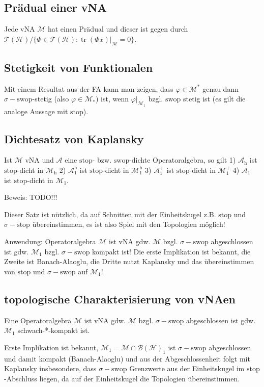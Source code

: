 \documentclass[11pt,a4paper]{scrartcl}
\newcommand{\Hc}{\mathcal{H}}
\newcommand{\A}{\mathcal{A}}
\newcommand{\B}{\mathcal{B}}
\newcommand{\M}{\mathcal{M}}
\newcommand{\T}{\mathcal{T}}
\theoremstyle{plain}
\theoremstyle{definition}
\theoremstyle{remark}
\DeclareMathOperator{\tr}{tr}
\begin{document}
\subsection{Prädual einer vNA}

Jede vNA $\M$ hat einen Prädual und dieser ist gegen durch $\T(\Hc)/\{\Phi\in \T(\Hc): \tr(\Phi x)|_\M = 0 \}$.

\subsection{Stetigkeit von Funktionalen}

Mit einem Resultat aus der FA kann man zeigen, dass $\varphi \in \M^*$ genau dann $\sigma-\mathrm{swop}$-stetig (also $\varphi\in \M_*$) ist, wenn $\varphi|_{\M_1}$ bzgl. $\mathrm{swop}$ stetig ist (es gilt die analoge Aussage mit $\mathrm{stop}$).

\subsection{Dichtesatz von Kaplansky}

Ist $\M$ vNA und $\A$ eine $\mathrm{stop}$- bzw. $\mathrm{swop}$-dichte Operatoralgebra, so gilt 1) $\A_\mathrm{h}$ ist $\mathrm{stop}$-dicht in $\M_\mathrm{h}$ 2) $\A_1^\mathrm{h}$ ist $\mathrm{stop}$-dicht in $\M_1^\mathrm{h}$ 3) $\A_1^+$ ist $\mathrm{stop}$-dicht in $\M_1^+$ 4) $\A_1$ ist $\mathrm{stop}$-dicht in $\M_1$.

Beweis: TODO!!!

Dieser Satz ist nützlich, da auf Schnitten mit der Einheitskugel z.B. $\mathrm{stop}$ und $\sigma-\mathrm{stop}$ übereinstimmen, es ist also Spiel mit den Topologien möglich!

Anwendung: Operatoralgebra $\M$ ist vNA gdw. $\M$ bzgl. $\sigma-\mathrm{swop}$ abgeschlossen ist gdw. $\M_1$ bzgl. $\sigma-\mathrm{swop}$ kompakt ist! Die erste Implikation ist bekannt, die Zweite ist Banach-Alaoglu, die Dritte nutzt Kaplansky und das übereinstimmen von $\mathrm{stop}$ und $\sigma-\mathrm{swop}$ auf $\M_1$!

\subsection{topologische Charakterisierung von vNAen}

Eine Operatoralgebra $\M$ ist vNA gdw. $\M$ bzgl. $\sigma-\mathrm{swop}$ abgeschlossen ist gdw. $\M_1$ schwach-*-kompakt ist.

Erste Implikation ist bekannt, $\M_1=\M\cap \B(\Hc)_1$ ist $\sigma-\mathrm{swop}$ abgeschlossen und damit kompakt (Banach-Alaoglu) und aus der Abgeschlossenheit folgt mit Kaplansky insbesondere, dass $\sigma-\mathrm{swop}$ Grenzwerte aus der Einheitskugel im $\mathrm{stop}$-Abschluss liegen, da auf der Einheitskugel die Topologien übereinstimmen.
\end{document}
